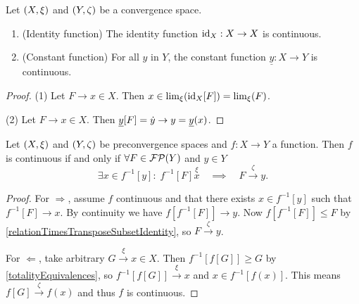 \begin{lemma} \label{continuityConstructions}
Let $\left( X,\xi \right)$ and $\left( Y,\zeta \right)$ be a convergence space.
\begin{enumerate}
\item \textup{(Identity function)} The identity function $\operatorname{id}_X:X\to X$ is continuous.
\item \textup{(Constant function)} For all $y$ in $Y$, the constant function $\underline{y}: X \to Y$ is continuous.
\end{enumerate}
\end{lemma}
\begin{proof}
(1) Let $F\to x \in X$. Then $x\in \lim_\xi(\operatorname{id}_X[F]) = \lim_\xi(F)$.

(2) Let $F\to x \in X$. Then $\underline{y}[F] = \dot{y} \to y = \underline{y}(x)$.
\end{proof}

\begin{lemma} \label{inverseImageContinuity}
Let $\left( X,\xi \right)$ and $\left( Y,\zeta \right)$ be preconvergence spaces and $f: X\to Y$ a function. Then $f$ is continuous \textup{if and only if} $\forall F\in \operatorname{\mathcal{FP}}(Y)$ and $y\in Y$
\[ \exists x\in f^{-1}[y]: \; f^{-1}[F] \overset{\xi}{x} \quad\implies\quad F \overset{\zeta}{\longrightarrow} y. \]
\end{lemma}
\begin{proof}
For $\Rightarrow$, assume $f$ continuous and that there exists $x\in f^{-1}[y]$ such that $f^{-1}[F] \to x$. By continuity we have $f[f^{-1}[F]] \to y$. Now $f[f^{-1}[F]] \leq F$ by \ref{relationTimesTransposeSubsetIdentity}, so $F \overset{\zeta}{\longrightarrow} y$.

For $\Leftarrow$, take arbitrary $G \overset{\xi}{\longrightarrow} x \in X$. Then $f^{-1}[f[G]] \geq G$ by \ref{totalityEquivalences}, so $f^{-1}[f[G]] \overset{\xi}{\longrightarrow} x$ and $x \in f^{-1}[f(x)]$. This means $f[G] \overset{\zeta}{\longrightarrow} f(x)$ and thus $f$ is continuous.
\end{proof}

